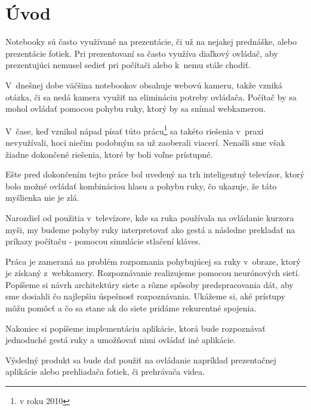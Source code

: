 {}
{}
\chapter*{Úvod}\label{chap:intro}
Notebooky sú často využívané na prezentácie, či už na nejakej prednáške, alebo prezentácie fotiek. Pri prezentovaní sa často využíva diaľkový ovládač, aby prezentujúci nemusel sedieť pri počítači alebo k~nemu stále chodiť.

V~dnešnej dobe väčšina notebookov obsahuje webovú kameru, takže vzniká otázka, či sa nedá kamera využiť na elimináciu potreby ovládača. Počítač by sa mohol ovládať pomocou pohybu ruky, ktorý by sa snímal webkamerou.

V~čase, keď vznikol nápad písať túto prácu\footnote{v roku 2010} sa takéto riešenia v~praxi nevyužívali, hoci niečim podobným sa už zaoberali viacerí. Nenašli sme však žiadne dokončené riešenia, ktoré by boli voľne prístupné.

Ešte pred dokončením tejto práce bol uvedený na trh inteligentný televízor, ktorý bolo možné ovládať kombináciou hlasu a pohybu ruky, čo ukazuje, že táto myšlienka nie je zlá. 

Narozdiel od použitia v~televízore, kde sa ruka používala na ovládanie kurzora myši, my budeme pohyby ruky interpretovať ako gestá a následne prekladať na príkazy počítaču - pomocou simulácie stlačení kláves.

Práca je zameraná na problém rozpoznania pohybujúcej sa ruky v~obraze, ktorý je získaný z~webkamery. Rozpoznávanie realizujeme pomocou neurónových sietí. Popíšeme si návrh architektúry siete a rôzne spôsoby predspracovania dát, aby sme dosiahli čo najlepšiu úspešnosť rozpoznávania. Ukážeme si, aké prístupy môžu pomôcť a čo sa stane ak do siete pridáme rekurentné spojenia. 

Nakoniec si popíšeme implementáciu aplikácie, ktorá bude rozpoznávať jednoduché gestá ruky a umožňovať nimi ovládať iné aplikácie.

Výsledný produkt sa bude dať použiť na ovládanie napríklad prezentačnej aplikácie alebo prehliadača fotiek, či prehrávača videa.